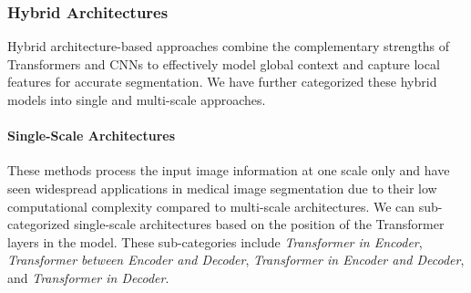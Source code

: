 \documentclass[10pt,journal,compsoc]{IEEEtran}
\begin{document}
\subsubsection{\textbf{Hybrid Architectures}} 

Hybrid architecture-based approaches combine the complementary strengths of Transformers and CNNs to effectively model global context and capture local features for accurate segmentation. We have further categorized these hybrid models into single and multi-scale approaches.

\paragraph{{\textbf{Single-Scale Architectures}}}

These methods process the input image information at one scale only and have seen widespread applications in medical image segmentation due to their low computational complexity compared to multi-scale architectures. 
We can sub-categorized single-scale architectures based on the position of the Transformer layers in the model. These sub-categories include \textit{Transformer in Encoder}, \textit{Transformer between Encoder and Decoder}, \textit{Transformer in Encoder and Decoder}, and \textit{Transformer in Decoder}.
\end{document}
